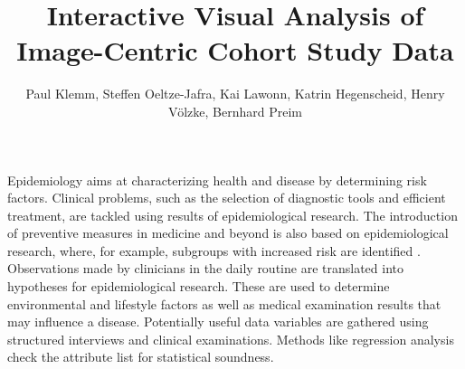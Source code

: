 \documentclass[journal]{style/vgtc} 			          %
\title{Interactive Visual Analysis of Image-Centric Cohort Study Data}
\author{Paul Klemm, Steffen Oeltze-Jafra, Kai Lawonn, Katrin Hegenscheid, Henry V{\"o}lzke, Bernhard Preim}
\begin{document}


\maketitle
Epidemiology aims at characterizing health and disease by determining risk factors.
%
Clinical problems, such as the selection of diagnostic tools and efficient treatment, are tackled using results of epidemiological research.
%
The introduction of preventive measures in medicine and beyond is also based on epidemiological research, where, for example, subgroups with increased risk are identified \cite{Fletcher2012}.
%
Observations made by clinicians in the daily routine are translated into hypotheses for epidemiological research.
%
These are used to determine environmental and lifestyle factors as well as medical examination results that may influence a disease.
%
Potentially useful data variables are gathered using structured interviews and clinical examinations.
%
Methods like regression analysis check the attribute list for statistical soundness.
%
\end{document}

